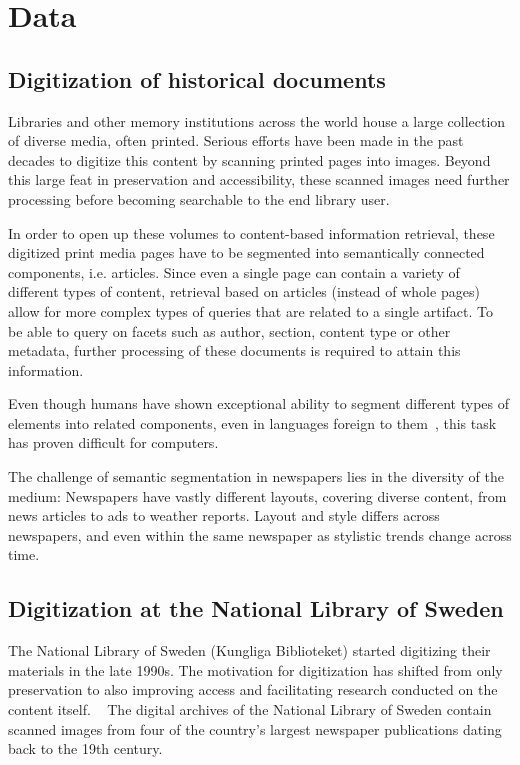 \documentclass[oneside, english, bibtex]{kththesis}
\begin{document}
\section{Data}

\subsection{Digitization of historical documents}

Libraries and other memory institutions across the world house a large collection of diverse media, often printed. Serious efforts have been made in the past decades to digitize this content by scanning printed pages into images. Beyond this large feat in preservation and accessibility, these scanned images need further processing before becoming searchable to the end library user.

In order to open up these volumes to content-based information retrieval, these digitized print media pages have to be segmented into semantically connected components, i.e. articles. Since even a single page can contain a variety of different types of content, retrieval based on articles (instead of whole pages) allow for more complex types of queries that are related to a single artifact. To be able to query on facets such as author, section, content type or other metadata, further processing of these documents is required to attain this information.

Even though humans have shown exceptional ability to segment different types of elements into related components, even in languages foreign to them~\cite{8270006}, this task has proven difficult for computers.

The challenge of semantic segmentation in newspapers lies in the diversity of the medium: Newspapers have vastly different layouts, covering diverse content, from news articles to ads to weather reports. Layout and style differs across newspapers, and even within the same newspaper as stylistic trends change across time.


\subsection{Digitization at the National Library of Sweden}

The National Library of Sweden (Kungliga Biblioteket) started digitizing their materials in the late 1990s. The motivation for digitization has shifted from only preservation to also improving access and facilitating research conducted on the content itself. ~\cite{Rekathati_2020} The digital archives of the National Library of Sweden contain scanned images from four of the country’s largest newspaper publications dating back to the 19th century.
\end{document}
